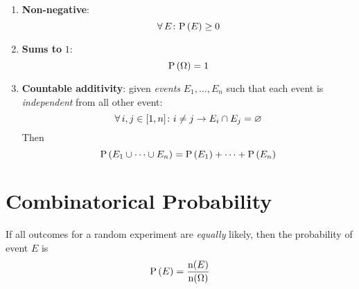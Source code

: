 \begin{enumerate}
    \item \textbf{Non-negative}:
    \begin{equation*}
        \operatorname{\forall} E \colon \mathrm{P} \left( E \right) \ge 0
    \end{equation*}
    \item \textbf{Sums to} $1$:
    \begin{equation*}
        \mathrm{P} \left( \Omega \right) = 1
    \end{equation*}
    \item \textbf{Countable additivity}: given \textit{events} $E_1, \dots, E_n$ such that each event is \textit{independent} from all other event:
    \begin{equation*}
        \operatorname{\forall} i, j \in [1, n] \colon i \ne j \to E_i \cap E_j = \varnothing
    \end{equation*}
    Then
    \begin{equation*}
        \mathrm{P} \left( E_1 \cup \cdots \cup E_n \right) = \mathrm{P} \left( E_1 \right) + \cdots + \mathrm{P} \left( E_n \right)
    \end{equation*}
\end{enumerate}

\section*{Combinatorical Probability}

If all outcomes for a random experiment are \textit{equally} likely, then the probability of event $E$ is
\begin{equation*}
    \mathrm{P} \left( E \right) = \frac{ \mathrm{n}(E) }{ \mathrm{n}(\Omega) }
\end{equation*}

